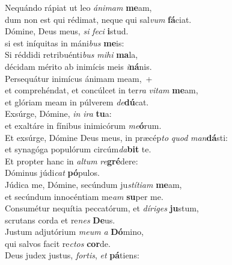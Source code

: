 \evenverse Nequándo rápiat ut leo \textit{á}\textit{ni}\textit{mam} \textbf{me}am,~\*\\
\evenverse dum non est qui rédimat, neque qui sal\textit{vum} \textbf{fá}ciat.\\
\oddverse Dómine, Deus meus, \textit{si} \textit{fe}\textit{ci} \textbf{i}stud.~\*\\
\oddverse si est iníquitas in máni\textit{bus} \textbf{me}is:\\
\evenverse Si réddidi retribuénti\textit{bus} \textit{mi}\textit{hi} \textbf{ma}la,~\*\\
\evenverse décidam mérito ab inimícis meis \textit{i}\textbf{ná}nis.\\
\oddverse Persequátur inimícus ánimam meam,~+\\
\oddverse  et comprehéndat, et concúlcet in ter\textit{ra} \textit{vi}\textit{tam} \textbf{me}am,~\*\\
\oddverse et glóriam meam in púlverem \textit{de}\textbf{dú}cat.\\
\evenverse Exsúrge, Dómine, \textit{in} \textit{i}\textit{ra} \textbf{tu}a:~\*\\
\evenverse et exaltáre in fínibus inimicórum \textit{me}\textbf{ó}rum.\\
\oddverse Et exsúrge, Dómine Deus meus, in præcép\textit{to} \textit{quod} \textit{man}\textbf{dá}sti:~\*\\
\oddverse et synagóga populórum circúm\textit{da}\textbf{bit} te.\\
\evenverse Et propter hanc in \textit{al}\textit{tum} \textit{re}\textbf{gré}dere:~\*\\
\evenverse Dóminus júdi\textit{cat} \textbf{pó}pulos.\\
\oddverse Júdica me, Dómine, secúndum ju\textit{stí}\textit{ti}\textit{am} \textbf{me}am,~\*\\
\oddverse et secúndum innocéntiam me\textit{am} \textbf{su}per me.\\
\evenverse Consumétur nequítia peccatórum, et \textit{dí}\textit{ri}\textit{ges} \textbf{ju}stum,~\*\\
\evenverse scrutans corda et re\textit{nes} \textbf{De}us.\\
\oddverse Justum adjutórium \textit{me}\textit{um} \textit{a} \textbf{Dó}mino,~\*\\
\oddverse qui salvos facit re\textit{ctos} \textbf{cor}de.\\
\evenverse Deus judex justus, \textit{for}\textit{tis}, \textit{et} \textbf{pá}tiens:~\*\\
